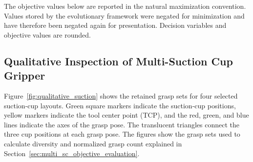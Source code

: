 The objective values below are reported in the natural maximization
convention. Values stored by the evolutionary framework were negated
for minimization and have therefore been negated again for presentation.
Decision variables and objective values are rounded.

\subsection{Qualitative Inspection of Multi-Suction Cup Gripper}
\label{subsec:qualitative_suction}

Figure~\ref{fig:qualitative_suction} shows the retained grasp sets for
four selected suction-cup layouts. Green square markers indicate the suction-cup
positions, yellow markers indicate the tool center point (TCP), and the red,
green, and blue lines indicate the axes of the grasp pose. The translucent
triangles connect the three cup positions at each grasp pose. The figures show
the grasp sets used to calculate diversity and normalized grasp count explained
in Section~\ref{sec:multi_sc_objective_evaluation}.

